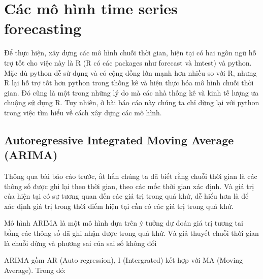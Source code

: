 \chapter{Các mô hình time series forecasting}

Để thực hiện, xây dựng các mô hình chuỗi thời gian, hiện tại có hai ngôn ngữ hỗ trợ tốt cho việc này là R (R có các packages như forecast và lmtest) và python. Mặc dù python dễ sử dụng và có cộng đồng lớn mạnh hơn nhiều so với R, nhưng R lại hỗ trợ tốt hơn python trong thống kê và hiện thực hóa mô hình chuỗi thời gian. Đó cũng là một trong những lý do mà các nhà thống kê và kinh tế lượng ưa chuộng sử dụng R. Tuy nhiên, ở bài báo cáo này chúng ta chỉ dừng lại với python trong việc tìm hiểu về cách xây dựng các mô hình.

\section{Autoregressive Integrated Moving Average (ARIMA)}

Thông qua bài báo cáo trước, ắt hẳn chúng ta đã biết rằng chuỗi thời gian là các thông số được ghi lại theo thời gian, theo các mốc thời gian xác định. Và giá trị của hiện tại có sự tương quan đến các giá trị trong quá khứ, dễ hiểu hơn là để xác định giá trị trong thời điểm hiện tại cần có các giá trị trong quá khứ.

\bigskip
Mô hình ARIMA là một mô hình dựa trên ý tưởng dự đoán giá trị tương tai bằng các thông số đã ghi nhận được trong quá khứ. Và giả thuyết chuỗi thời gian là chuỗi dừng và phương sai của sai số không đổi

\bigskip
ARIMA gồm AR (Auto regression), I (Intergrated) kết hợp với MA (Moving Average). Trong đó:

